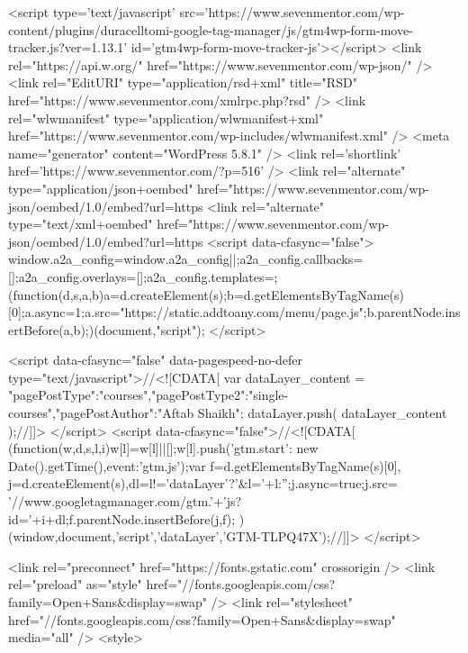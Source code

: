 {{<script type='text/javascript' src='https://www.sevenmentor.com/wp-content/plugins/duracelltomi-google-tag-manager/js/gtm4wp-form-move-tracker.js?ver=1.13.1' id='gtm4wp-form-move-tracker-js'></script>
<link rel="https://api.w.org/" href="https://www.sevenmentor.com/wp-json/" /><link rel="EditURI" type="application/rsd+xml" title="RSD" href="https://www.sevenmentor.com/xmlrpc.php?rsd" />
<link rel="wlwmanifest" type="application/wlwmanifest+xml" href="https://www.sevenmentor.com/wp-includes/wlwmanifest.xml" />
<meta name="generator" content="WordPress 5.8.1" />
<link rel='shortlink' href='https://www.sevenmentor.com/?p=516' />
<link rel="alternate" type="application/json+oembed" href="https://www.sevenmentor.com/wp-json/oembed/1.0/embed?url=https%
<link rel="alternate" type="text/xml+oembed" href="https://www.sevenmentor.com/wp-json/oembed/1.0/embed?url=https%
<script data-cfasync="false">
window.a2a_config=window.a2a_config||{};a2a_config.callbacks=[];a2a_config.overlays=[];a2a_config.templates={};
(function(d,s,a,b){a=d.createElement(s);b=d.getElementsByTagName(s)[0];a.async=1;a.src="https://static.addtoany.com/menu/page.js";b.parentNode.insertBefore(a,b);})(document,"script");
</script>

<script data-cfasync="false" data-pagespeed-no-defer type="text/javascript">//<![CDATA[
	var dataLayer_content = {"pagePostType":"courses","pagePostType2":"single-courses","pagePostAuthor":"Aftab Shaikh"};
	dataLayer.push( dataLayer_content );//]]>
</script>
<script data-cfasync="false">//<![CDATA[
(function(w,d,s,l,i){w[l]=w[l]||[];w[l].push({'gtm.start':
new Date().getTime(),event:'gtm.js'});var f=d.getElementsByTagName(s)[0],
j=d.createElement(s),dl=l!='dataLayer'?'&l='+l:'';j.async=true;j.src=
'//www.googletagmanager.com/gtm.'+'js?id='+i+dl;f.parentNode.insertBefore(j,f);
})(window,document,'script','dataLayer','GTM-TLPQ47X');//]]>
</script>

 <link rel="preconnect" href="https://fonts.gstatic.com" crossorigin />
<link rel="preload" as="style" href="//fonts.googleapis.com/css?family=Open+Sans&display=swap" />
<link rel="stylesheet" href="//fonts.googleapis.com/css?family=Open+Sans&display=swap" media="all" />
<style>
                    
}}
